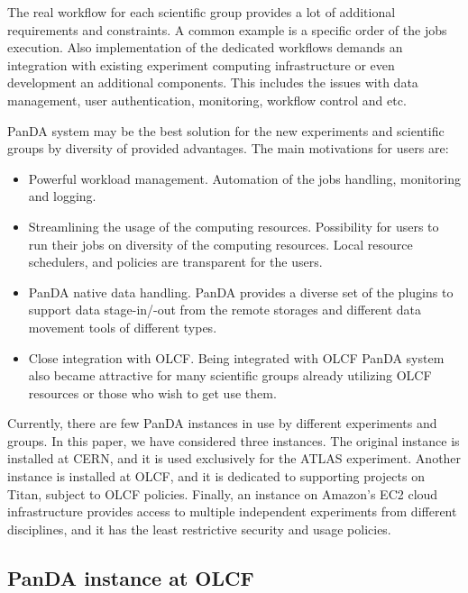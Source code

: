 The real workflow for each scientific group provides a lot of additional
requirements and constraints. A common example is a specific order of the jobs
execution. Also implementation of the dedicated workflows demands an
integration with existing experiment computing infrastructure or even
development an additional components. This includes the issues with data
management, user authentication, monitoring, workflow control and etc.

PanDA system may be the best solution for the new experiments and scientific groups by diversity of provided advantages. The main motivations for users are:
\begin{itemize}
    \item Powerful workload management. Automation of the jobs handling,
        monitoring and logging.
    \item Streamlining the usage of the computing resources. Possibility for
        users to run their jobs on diversity of the computing resources. Local
        resource schedulers, and policies are transparent for the users.
    \item PanDA native data handling. PanDA provides a diverse set of the
        plugins to support data stage-in/-out from the remote storages and
        different data movement tools of different types.
    \item Close integration with OLCF. Being integrated with OLCF PanDA system
        also became attractive for many scientific groups already utilizing
        OLCF resources or those who wish to get use them. 
\end{itemize}

Currently, there are few PanDA instances in use by different experiments and groups. 
In this paper, we have considered three instances. The original instance is installed at CERN, 
and it is used exclusively for the ATLAS experiment. Another instance is installed at OLCF, 
and it is dedicated to supporting projects on Titan, subject to OLCF policies. 
Finally, an instance on Amazon’s EC2 cloud infrastructure provides access to multiple independent 
experiments from different disciplines, and it has the least restrictive security and usage policies.

\subsection{PanDA instance at OLCF}
\label{subsec:panda_instance}


